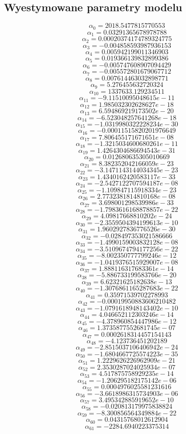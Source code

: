 \subsection{Wyestymowane parametry modelu}
\[\alpha_{0} = 2018.5477815770553\]
\[\alpha_{1} = 0.03291365678978788\]
\[\alpha_{2} = 0.00020374174789324775\]
\[\alpha_{3} = -0.004858593987936153\]
\[\alpha_{4} = 0.005942199011346903\]
\[\alpha_{5} = 0.019366139832899386\]
\[\alpha_{6} = -0.005747608907094429\]
\[\alpha_{7} = -0.005572801679067712\]
\[\alpha_{8} = 0.007614463032898771\]
\[\alpha_{9} = 5.276455632720324\]
\[\alpha_{10} = 1337633.129234511\]
\[\alpha_{11} = -9.11510095048615e-11\]
\[\alpha_{12} = 1.985032302628627e-18\]
\[\alpha_{13} = 6.594869219173502e-20\]
\[\alpha_{14} = -6.523048257641268e-18\]
\[\alpha_{15} = -1.0319980322228234e-30\]
\[\alpha_{16} = -0.00011515820201976649\]
\[\alpha_{17} = 7.806455171671651e-08\]
\[\alpha_{18} = -1.3215034600680261e-11\]
\[\alpha_{19} = 1.4264304686694543e-31\]
\[\alpha_{20} = 0.012680635305010669\]
\[\alpha_{21} = 8.382352042166059e-23\]
\[\alpha_{22} = -3.1471143144034345e-23\]
\[\alpha_{23} = 1.4340162420583117e-33\]
\[\alpha_{24} = -2.5427122707594187e-08\]
\[\alpha_{25} = -1.109847115918334e-23\]
\[\alpha_{26} = 2.7732381814810168e-08\]
\[\alpha_{27} = 3.698001298539986e-33\]
\[\alpha_{28} = -1.7983616168878857e-22\]
\[\alpha_{29} = 4.09817668810202e-24\]
\[\alpha_{30} = -2.3559504394199613e-10\]
\[\alpha_{31} = 1.9602927836776526e-30\]
\[\alpha_{32} = -0.028497353021586666\]
\[\alpha_{33} = -1.4990159003832128e-08\]
\[\alpha_{34} = -3.5109674794177256e-22\]
\[\alpha_{35} = -8.002350777799246e-12\]
\[\alpha_{36} = -1.0419376515929007e-08\]
\[\alpha_{37} = 1.888116317683361e-14\]
\[\alpha_{38} = -5.886733199583766e-20\]
\[\alpha_{39} = 6.62321625182638e-13\]
\[\alpha_{40} = -1.3076861165287683e-22\]
\[\alpha_{41} = 0.35971539702278993\]
\[\alpha_{42} = -0.00019950883606210482\]
\[\alpha_{43} = -1.0791618948143402e-10\]
\[\alpha_{44} = 4.046652112303246e-14\]
\[\alpha_{45} = -4.378960854447986e-12\]
\[\alpha_{46} = 1.3735877552681745e-07\]
\[\alpha_{47} = 0.0002618314457154143\]
\[\alpha_{48} = -4.123736451202189\]
\[\alpha_{49} = -2.8515037106406942e-24\]
\[\alpha_{50} = -1.6804667725574223e-35\]
\[\alpha_{51} = 1.2229626226962909e-21\]
\[\alpha_{52} = 2.3530287024025934e-07\]
\[\alpha_{53} = 4.517875758929235e-14\]
\[\alpha_{54} = -1.206295182175142e-06\]
\[\alpha_{55} = 0.0004976025581231616\]
\[\alpha_{56} = -3.6618986315734903e-06\]
\[\alpha_{57} = 3.495342885919652e-10\]
\[\alpha_{58} = -0.020813179975838824\]
\[\alpha_{59} = -8.300856564349884e-22\]
\[\alpha_{60} = 0.04315768012612904\]
\[\alpha_{61} = -2284.6940223375314\]
